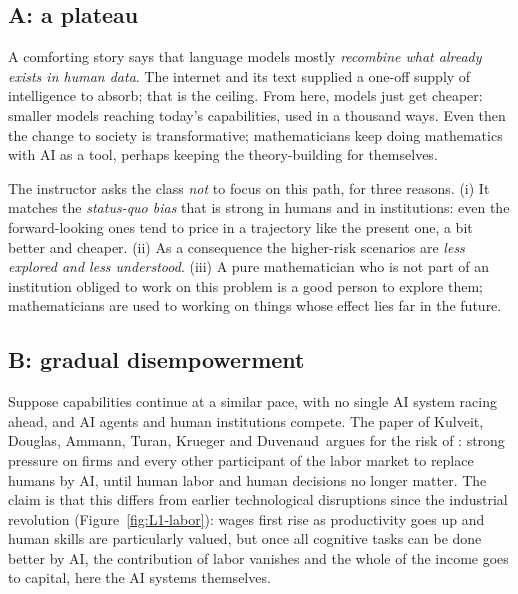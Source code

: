 \subsection{A: a plateau}
A comforting story says that language models mostly \emph{recombine what already exists in human data}. The internet and its text supplied a one-off supply of intelligence to absorb; that is the ceiling. From here, models just get cheaper:
smaller models reaching today's capabilities, used in a thousand ways. Even then the change to society is transformative; mathematicians keep doing mathematics with AI as a tool, perhaps keeping the theory-building for themselves.

The instructor asks the class \emph{not} to focus on this path, for three reasons. (i) It matches the \emph{status-quo bias} that is strong in humans and in institutions: even the forward-looking ones tend to price in a trajectory like the present
one, a bit better and cheaper. (ii) As a consequence the higher-risk scenarios are \emph{less explored and less understood}. (iii) A pure mathematician who is not part of an institution obliged to work on this problem is a good person to explore them; mathematicians are used to
working on things whose effect lies far in the future.

\subsection{B: gradual disempowerment}\label{sec:L1-gradual}
Suppose capabilities continue at a similar pace, with no single AI system racing ahead, and AI agents and human institutions compete. The paper of Kulveit, Douglas, Ammann, Turan, Krueger and Duvenaud\,\citep{kulveit2025}
argues for the risk of : strong pressure on firms and every other participant of the labor market to replace humans by AI, until human labor and human decisions no longer matter.
The claim is that this differs from earlier technological disruptions since the industrial revolution (Figure~\ref{fig:L1-labor}): wages first rise as productivity goes up and human skills are particularly valued, but once all cognitive tasks can be done better by AI, the contribution of labor
vanishes and the whole of the income goes to capital, here the AI systems themselves.

